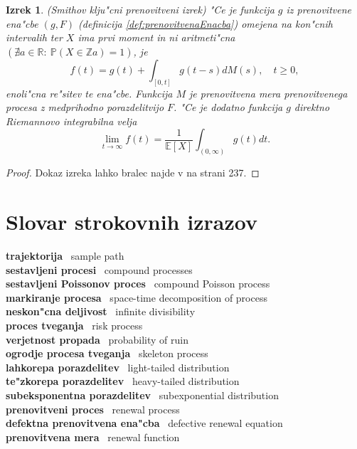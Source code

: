 \documentclass[12pt, a4paper, reqno]{amsart}
\theoremstyle{definition}
\theoremstyle{plain}
\newtheorem{izrek}[definicija]{Izrek}
\newcommand{\R}{\mathbb{R}}
\newcommand{\E}{\mathbb{E}}
\newcommand{\Prob}{\mathbb{P}}
\newcommand{\1}{\mathds{1}}
\begin{document}
    \begin{izrek}(Smithov klju"cni prenovitveni izrek)
        "Ce je funkcija $g$ iz prenovitvene ena"cbe $(g, F)$ (definicija \ref{def:prenovitvenaEnacba})
        omejena na kon"cnih intervalih ter $X$ ima prvi moment in ni aritmeti"cna 
        $(\nexists a\in\R: \ \Prob\left(X \in \mathbb{Z} a\right) = 1)$, je
        \begin{equation*}
            f(t) = g(t) +  \int_{[0, t]}g(t - s)dM(s), \quad t\geq 0,
        \end{equation*}
        enoli"cna re"sitev te ena"cbe. Funkcija $M$ je prenovitvena mera prenovitvenega procesa z medprihodno 
        porazdelitvijo $F$.
        "Ce je dodatno funkcija $g$ direktno Riemannovo integrabilna velja 
        \begin{equation*}
            \lim_{t\to\infty}f(t) = \frac{1}{\E\left[X\right]}\int_{(0, \infty)}g(t)dt.
        \end{equation*}
        \label{izr:Smith}
    \end{izrek}

    \begin{proof}
        Dokaz izreka lahko bralec najde v \cite{8} na strani 237. 
    \end{proof}


\section*{Slovar strokovnih izrazov}

\noindent
\textbf{trajektorija} \ sample path \\
\textbf{sestavljeni procesi} \  compound processes \\
\textbf{sestavljeni Poissonov proces} \ compound Poisson process \\
\textbf{markiranje procesa} \ space-time decomposition of process \\
\textbf{neskon"cna deljivost} \ infinite divisibility \\
\textbf{proces tveganja} \ risk process \\
\textbf{verjetnost propada} \ probability of ruin \\
\textbf{ogrodje procesa tveganja} \ skeleton process \\
\textbf{lahkorepa porazdelitev} \ light-tailed distribution \\
\textbf{te"zkorepa porazdelitev} \ heavy-tailed distribution \\
\textbf{subeksponentna porazdelitev} \ subexponential distribution \\
\textbf{prenovitveni proces} \ renewal process \\
\textbf{defektna prenovitvena ena"cba} \ defective renewal equation \\
\textbf{prenovitvena mera} \ renewal function \\
\end{document}
